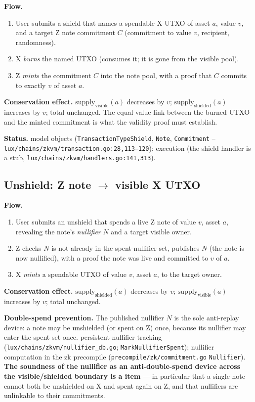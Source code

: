 \textbf{Flow.}
\begin{enumerate}[leftmargin=2em,nosep]
\item User submits a shield that names a spendable X UTXO of asset $a$,
  value $v$, and a target Z note commitment $C$ (commitment to value
  $v$, recipient, randomness).
\item X \emph{burns} the named UTXO (consumes it; it is gone from the
  visible pool).
\item Z \emph{mints} the commitment $C$ into the note pool, with a
  proof that $C$ commits to exactly $v$ of asset $a$.
\end{enumerate}

\textbf{Conservation effect.} $\mathrm{supply}_{\text{visible}}(a)$
decreases by $v$; $\mathrm{supply}_{\text{shielded}}(a)$ increases by
$v$; total unchanged. The equal-value link between the burned UTXO and
the minted commitment is what the validity proof must establish.

\textbf{Status.} \IMPL{} model objects (\texttt{TransactionTypeShield},
\texttt{Note}, \texttt{Commitment} --
\texttt{lux/chains/zkvm/transaction.go:28,113--120}); \DESIGN{}
execution (the shield handler is a stub,
\texttt{lux/chains/zkvm/handlers.go:141,313}).

\subsection{Unshield: Z note $\to$ visible X UTXO}

\textbf{Flow.}
\begin{enumerate}[leftmargin=2em,nosep]
\item User submits an unshield that spends a live Z note of value $v$,
  asset $a$, revealing the note's \emph{nullifier} $N$ and a target
  visible owner.
\item Z checks $N$ is not already in the spent-nullifier set, publishes
  $N$ (the note is now nullified), with a proof the note was live and
  committed to $v$ of $a$.
\item X \emph{mints} a spendable UTXO of value $v$, asset $a$, to the
  target owner.
\end{enumerate}

\textbf{Conservation effect.} $\mathrm{supply}_{\text{shielded}}(a)$
decreases by $v$; $\mathrm{supply}_{\text{visible}}(a)$ increases by $v$;
total unchanged.

\textbf{Double-spend prevention.} The published nullifier $N$ is the
sole anti-replay device: a note may be unshielded (or spent on Z) once,
because its nullifier may enter the spent set once. \IMPL{} persistent
nullifier tracking (\texttt{lux/chains/zkvm/nullifier\_db.go};
\texttt{MarkNullifierSpent}); \IMPL{} nullifier computation in the zk
precompile (\texttt{precompile/zk/commitment.go} \texttt{Nullifier}).
\textbf{The soundness of the nullifier as an anti-double-spend device
across the visible/shielded boundary is a \CRYPTO{} item} --- in
particular that a single note cannot both be unshielded on X and spent
again on Z, and that nullifiers are unlinkable to their commitments.

